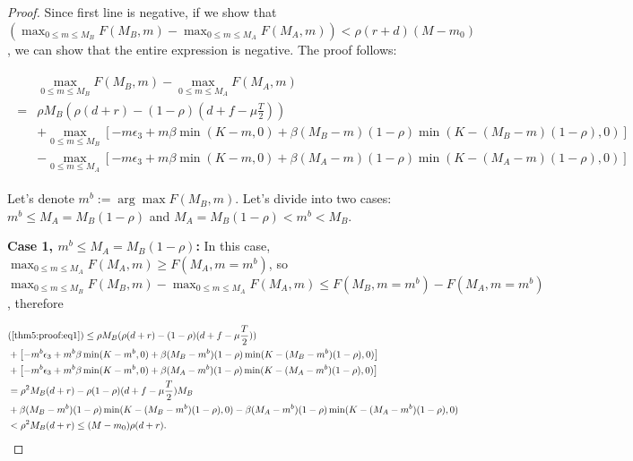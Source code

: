 \documentclass[11pt]{article}
\theoremstyle{plain}
\numberwithin{equation}{section}
\begin{document}
\begin{proof}
Since first line is negative, if we show that $\left(\max_{0\leq m\leq M_B}F( M_B,m)- \max_{0\leq m\leq M_A}F( M_A,m)\right)<\rho(r+d)(M-m_0)$, we can show that the entire expression is negative. The proof follows:

\begin{gather}
	\begin{aligned}
			&\max_{0\leq m\leq M_B}F( M_B,m)- \max_{0\leq m\leq M_A}F( M_A,m)\\
	=& \rho M_B (\rho (d+r)-(1-\rho) (d+f-\mu {\frac{T}{2}}))\\
	&+ \max_{0\leq m\leq M_B}\left[
	-m\epsilon_3 +m\beta \min (K-m,0)+\beta (M_B-m)(1-\rho) \min(K-(M_B-m)(1-\rho),0)
	\right]
	\\
	&- \max_{0\leq m\leq M_A}\left[
	-m\epsilon_3 +m\beta \min (K-m,0)+\beta (M_A-m)(1-\rho) \min(K-(M_A-m)(1-\rho),0)
	\right]
	\end{aligned}\label{thm5:proof:eq1}
\end{gather}

Let's denote $m^{b}:=\arg\max F( M_B,m)$. Let's divide into two cases:  $m^{b}\leq M_A=M_B(1-\rho)$ and $ M_A=M_B(1-\rho)<m^{b}<M_B$.

\noindent\textbf{Case 1,  $m^{b}\leq M_A=M_B(1-\rho)$:}
In this case, $\max_{0\leq m\leq M_A}F( M_A,m)\geq F(M_A,m=m^b)$, so
$\max_{0\leq m\leq M_B}F( M_B,m)- \max_{0\leq m\leq M_A}F( M_A,m) \leq 
F(M_B,m=m^b)-F(M_A,m=m^b)$, therefore


\begin{align*}
	&(\ref{thm5:proof:eq1})\leq \rho M_B (\rho (d+r)-(1-\rho) (d+f-\mu {\frac{T}{2}}))\\
	&+ \left[
	-m^{b}\epsilon_3 +m^{b}\beta \min (K-m^{b},0)+\beta (M_B-m^{b})(1-\rho) \min(K-(M_B-m^{b})(1-\rho),0)
	\right]
	\\
	&+ \left[
	-m^{b}\epsilon_3 +m^{b}\beta \min (K-m^{b},0)+\beta (M_A-m^{b})(1-\rho) \min(K-(M_A-m^{b})(1-\rho),0)
	\right]\\
&= \rho^2 M_B(d+r) - \rho (1-\rho) (d+f-\mu {\frac{T}{2}}) M_B\\
&+\beta (M_B-m^{b})(1-\rho) \min(K-(M_B-m^{b})(1-\rho),0)-\beta (M_A-m^{b})(1-\rho) \min(K-(M_A-m^{b})(1-\rho),0)
\\&< \rho^2 M_B(d+r)\leq (M-m_0)\rho(d+r).
\end{align*}
 
%
%



\end{proof}
\end{document}
